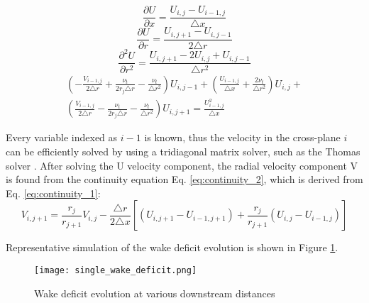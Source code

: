 \documentclass{umthesis}
\begin{document}
\begin{equation}\label{eq:du_dx}
  \frac{\partial U}{\partial x}=\frac{U_{i,j}-U_{i-1,j}}{\triangle x}
\end{equation}
\begin{equation}\label{eq:du_dr}
  \frac{\partial U}{\partial r}=\frac{U_{i,j+1}-U_{i,j-1}}{2 \triangle r}
\end{equation}
\begin{equation}\label{eq:du2_dr2}
  \frac{\partial^2 U}{\partial r^2}=\frac{U_{i,j+1}-2U_{i,j}+U_{i,j-1}}{\triangle r^2}
\end{equation}
\begin{equation}\label{eq:x_momentum_3}
  \begin{split}
  (- \frac{V _{i-1,j}}{2\triangle r}+\frac{\nu _t}{2r_j \triangle r}-\frac{\nu _t}{\triangle r^2})U_{i,j-1} +(\frac{U_{i-1,j}}{\triangle x}+\frac{2\nu _t}{\triangle r^2})U_{i,j}+ \\
  (\frac{V_{i-1,j}}{2\triangle r}-\frac{\nu _t}{2r_j\triangle r}-\frac{\nu _t}{\triangle r^2})U_{i,j+1}=\frac{U^2 _{i-1,j}}{\triangle x}
  \end{split}
\end{equation}



Every variable indexed as $i-1$ is known, thus the velocity in the cross-plane $i$ can be efficiently solved by using a tridiagonal matrix solver, such as the Thomas solver \cite{Thomas}. After solving the U velocity component, the radial velocity component V is found from the continuity equation Eq. \ref{eq:continuity_2}, which is derived from Eq. \ref{eq:continuity_1}:
\begin{equation}\label{eq:continuity_2}
V_{i,j+1}=\frac{r_j}{r_{j+1}}V_{i,j}-\frac{\triangle r}{2\triangle x}[(U_{i,j+1}-U_{i-1,j+1})+\frac{r_j}{r_{j+1}}(U_{i,j}-U_{i-1,j})]
\end{equation}

Representative simulation of the wake deficit evolution is shown in Figure \ref{fig:wake_deficit}.

\begin{figure}
  \centering
  \texttt{[image: single\_wake\_deficit.png]}
  \caption{Wake deficit evolution at various downstream distances}\label{fig:wake_deficit}
\end{figure}

\end{document}
